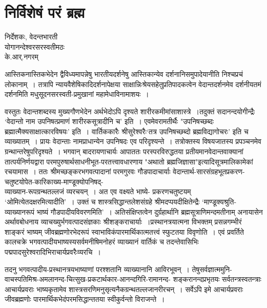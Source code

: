 {\fontsize{15}{17}\selectfont
\presetvalues
\chapter{निर्विशेषं परं ब्रह्म}

\begin{center}
\smallskip

निर्देशकः, वेदन्तभारती\\
योगानन्देश्वरसरस्वतीमठः\\
के.आर्.नगरम्
\addrule
\end{center}

आस्तिकनास्तिकभेदेन द्वैविध्यमापन्नेषु भारतीयदर्शनेषु आस्तिकान्येव दर्शनानि\break समुपादेयानीति निश्चप्रचं लोकानाम्~। तत्रापि न्यायवैशेषिकादिदर्शनापेक्षया साक्षान्निः\break श्रेयसहेतुप्रतिपादकत्वेन वेदान्तदर्शनमेव दर्शनीयतमं दर्शनमिति मधुसूदनसरस्वती-प्रमुखानां महामेधाविनामाशयः~। 

वस्तुतः वेदान्तशब्दस्य मुख्यगौणभेदेन अर्थभेदोऽपि दृश्यते शारीरकमीमांसाशास्त्रे~।\break तदुक्तं सदानन्दयोगीन्द्रैः ‘वेदान्तो नाम उपनिषत्प्रमाणं शारीरकसूत्रादीनि च' इति~। एवमेव\break रामतीर्थैः "उपनिषच्छब्दः ब्रह्मात्मैक्यसाक्षात्कारविषयः' इति~। वार्तिककारैः श्रीसुरेश्वरैः\break ‘तत्र उपनिषच्छब्दो ब्रह्मविद्यागोचरः' इति च व्याख्यातम्~। प्रायः वेदान्ताः नाम\break प्राधान्येन उपनिषदः एव परिदृश्यन्ते~। तत्रोक्तस्य विषयजातस्य प्रपञ्चनमेव ग्रन्थान्तरेषु\break परिदृश्यते~। भगवान् बादरायणाचार्यः आपाततः परस्परविरुद्धतया प्रतीयमानवेदान्तवाक्यानां तात्पर्यनिर्णयद्वारा परमपुरुषार्थसाधनीभूत-परतत्त्वावधारणाय "अथातो ब्रह्मजिज्ञासा"\break इत्यादिसूत्रमालिकामेकां  रचयामास~। ततः श्रीमच्छङ्करभगवत्पादानां परमगुरवः गौडपादाचार्याः वेदान्तार्थ-सारसंग्रहभूतप्रकरण-चतुष्टयोपेत-कारिकाख्य-माण्डूक्योपनिषद्-\\ व्याख्यान-रूपग्रन्थतल्लजं व्यरचयन्~। अत एव वक्ष्यते भाष्ये- प्रकरणचतुष्टयम् ‘ओमित्येतदक्षरमित्यादीति'~। उक्तं च शास्त्रसिद्धान्तलेशसंग्रहे श्रीमदप्पयदीक्षितेन्द्रैः ‘माण्डूक्यश्रुति-व्याख्यानरूपं भाष्यं गौडपादीयविवरणमिति'~। अतिसंक्षिप्तत्वेन दुर्ग्रहार्थानि ब्रह्मसूत्राणि\break मन्दमतीनाम् अनायासेन अर्थावबोधनाय व्याचख्युर्भगवत्पादसंज्ञकाः श्रीशङ्कराचार्याः~।\break प्रस्थानत्रयात्मना विभक्तम् प्रसन्नगम्भीरं शाङ्करं भाष्यम् जीवब्रह्मणोरभेदरूपं स्वाभाविकं\break पारमार्थिकात्मतत्त्वं स्फुटतया विवृणोति~। एवं प्रवर्तिते कालचक्रे भगवत्पादीयभाष्यस्य\break सर्वमनीषिमनोहरं व्याख्यानं वार्तिकं च तदन्तेवासिभिः पद्मपादसुरेश्वरादिभिराचार्यप्रवरैः\break व्यरचि~। 

तदनु भगवत्पादीय-प्रस्थानत्रयभाष्याणां परश्शतानि व्याख्यानानि आविरभूवन्~। तेषु\break सर्वज्ञात्ममुनि-वाचस्पतिमिश्र-अमलानन्द-चित्सुख-प्रकटार्थकार-आनन्दगिरि-रामानन्द- शङ्करानन्दप्रभृतयः सर्वतन्त्रस्वतन्त्राः आचार्यप्रवराः भाष्यकृतामेव शास्त्रसरणिमनुसृत्य\break नैकग्रन्थतल्लजानरीरचन्~। सर्वेऽपि इमे आचार्यप्रवराः जीवब्रह्मणोः पारमार्थिकभेदं\break परमसिद्धान्ततया स्वीकुर्वन्तो विराजन्ते~। 

}
